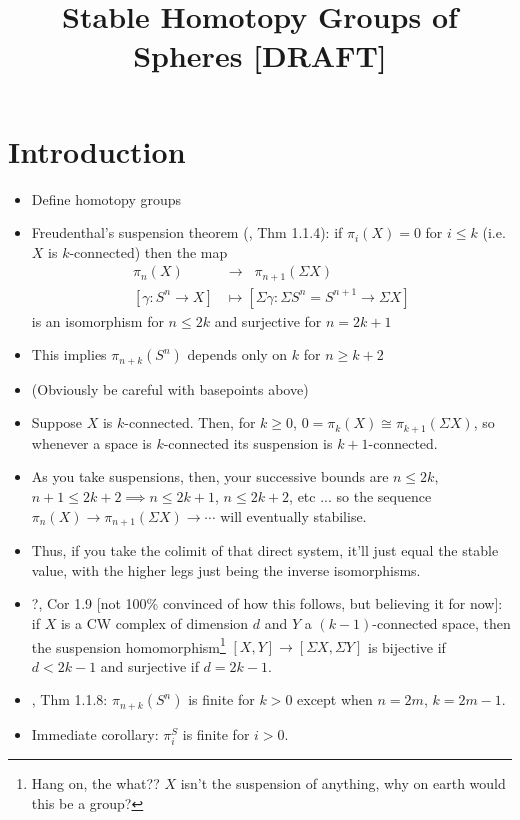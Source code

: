 \documentclass{MetricNotes2023}
\author{\vspace{-5ex}}
\title{Stable Homotopy Groups of Spheres  [DRAFT]}
\date{\vspace{-5ex}}
\begin{document}
\maketitle
%

\DeclarePairedDelimiter{\norm}{\lVert}{\rVert} 
\DeclarePairedDelimiter{\abs}{\lvert}{\rvert} 
\DeclarePairedDelimiter{\ang}{\langle}{\rangle} 

\tableofcontents

\pagebreak

\section{Introduction}

\begin{itemize}
\item Define homotopy groups
\item Freudenthal's suspension theorem (\autocite{cobordism}, Thm 1.1.4): if \(\pi_i(X)=0\) for \(i\leq k\) (i.e. \(X\) is \(k\)-connected) then the map 
\begin{align*}
\pi_n(X) \;\;&\to\;\; \pi_{n+1}(\Sigma X)\\
[\gamma : S^n \to X] &\mapsto [\Sigma \gamma : \Sigma S^n=S^{n+1} \to \Sigma X]
\end{align*}
is an isomorphism for \(n \leq 2k\) and surjective for \(n=2k+1\)
\item This implies \(\pi_{n+k}(S^n)\) depends only on \(k\) for \(n\geq k+2\)
\item (Obviously be careful with basepoints above)
\item Suppose \(X\) is \(k\)-connected. Then, for \(k\geq 0\), \(0=\pi_k(X)\cong \pi_{k+1}(\Sigma X)\), so whenever a space is \(k\)-connected its suspension is \(k+1\)-connected. 
\item As you take suspensions, then, your successive bounds are \(n \leq 2k\), \(n+1\leq 2k+2\implies n \leq 2k+1\), \(n\leq 2k+2\), etc ... so the sequence \(\pi_n(X)\to \pi_{n+1}(\Sigma X)\to \cdots\) will eventually stabilise.  
\item Thus, if you take the colimit of that direct system, it'll just equal the stable value, with the higher legs just being the inverse isomorphisms.
\item ?\autocite{ass}, Cor 1.9 [not 100\% convinced of how this follows, but believing it for now]: if \(X\) is a CW complex of dimension \(d\) and \(Y\) a \((k-1)\)-connected space, then the suspension homomorphism\footnote{Hang on, the what?? \(X\) isn't the suspension of anything, why on earth would this be a group?} \([X, Y]\to[\Sigma X, \Sigma Y]\) is bijective if \(d<2k-1\) and surjective if \(d=2k-1\). 

\item \autocite{cobordism}, Thm 1.1.8: \(\pi_{n+k}(S^n)\) is finite for \(k>0\) except when \(n=2m\), \(k=2m-1\). 

\item Immediate corollary: \(\pi_i^S\) is finite for \(i>0\). 
\end{itemize}
\end{document}
